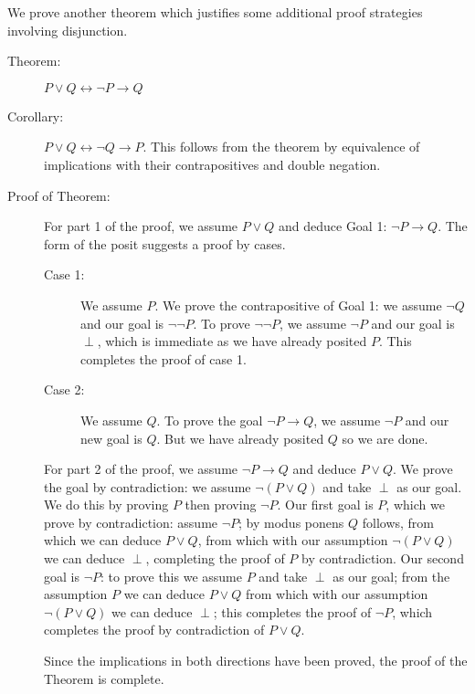 \documentclass[12pt]{book}
\begin{document}
We prove another theorem which justifies some additional proof
strategies involving disjunction.

\begin{description}

\item[Theorem:]  $P \vee Q \leftrightarrow \neg P \rightarrow Q$

\item[Corollary:] $P \vee Q \leftrightarrow \neg Q \rightarrow P$.  This
follows from the theorem by equivalence of implications with their
contrapositives and double negation.

\item[Proof of Theorem:] For part 1 of the proof, we assume $P \vee Q$
and deduce Goal 1: $\neg P \rightarrow Q$.  The form of the posit
suggests a proof by cases.  

\begin{description}

\item[Case 1:]  We assume $P$.  We prove the
contrapositive of Goal 1: we assume $\neg Q$ and our goal is $\neg\neg
P$.  To prove $\neg\neg P$, we assume $\neg P$ and our goal is $\perp$, which is immediate as we have already posited $P$.
This completes the proof of case 1.

\item[Case 2:]  We assume $Q$.  To prove the goal $\neg P \rightarrow Q$, we
assume $\neg P$ and our new goal is $Q$.  But we have already posited
$Q$ so we are done.

\end{description}

For part 2 of the proof, we assume $\neg P \rightarrow Q$ and deduce
$P \vee Q$.  We prove the goal by contradiction: we assume $\neg(P
\vee Q)$ and take $\perp$ as our goal.  We do this by proving $P$ then proving $\neg P$.  Our first goal is $P$, which we prove by
contradiction: assume $\neg P$; by modus ponens $Q$ follows, from
which we can deduce $P \vee Q$, from which with our assumption
$\neg(P \vee Q)$ we can deduce $\perp$, completing the proof of $P$ by contradiction.  Our
second goal is $\neg P$: to prove this we assume $P$ and take $\perp$ as our goal; from the assumption $P$ we can deduce $P
\vee Q$ from which with our assumption
$\neg (P \vee Q)$ we can deduce $\perp$; this completes the proof of $\neg P$, which
completes the proof by contradiction of $P \vee Q$.

Since the implications in both directions have been proved, the proof
of the Theorem is complete.

\end{description}
\end{document}
